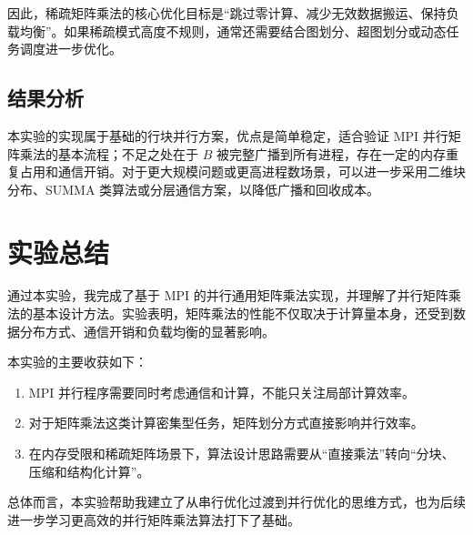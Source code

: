 \documentclass[12pt,a4paper]{ctexart}
\begin{document}
因此，稀疏矩阵乘法的核心优化目标是“跳过零计算、减少无效数据搬运、保持负载均衡”。如果稀疏模式高度不规则，通常还需要结合图划分、超图划分或动态任务调度进一步优化。

\subsection*{结果分析}
本实验的实现属于基础的行块并行方案，优点是简单稳定，适合验证 MPI 并行矩阵乘法的基本流程；不足之处在于 $B$ 被完整广播到所有进程，存在一定的内存重复占用和通信开销。对于更大规模问题或更高进程数场景，可以进一步采用二维块分布、SUMMA 类算法或分层通信方案，以降低广播和回收成本。

\section{实验总结}
通过本实验，我完成了基于 MPI 的并行通用矩阵乘法实现，并理解了并行矩阵乘法的基本设计方法。实验表明，矩阵乘法的性能不仅取决于计算量本身，还受到数据分布方式、通信开销和负载均衡的显著影响。

本实验的主要收获如下：
\begin{enumerate}[itemsep=0.3em]
  \item MPI 并行程序需要同时考虑通信和计算，不能只关注局部计算效率。
  \item 对于矩阵乘法这类计算密集型任务，矩阵划分方式直接影响并行效率。
  \item 在内存受限和稀疏矩阵场景下，算法设计思路需要从“直接乘法”转向“分块、压缩和结构化计算”。
\end{enumerate}

总体而言，本实验帮助我建立了从串行优化过渡到并行优化的思维方式，也为后续进一步学习更高效的并行矩阵乘法算法打下了基础。
\end{document}
